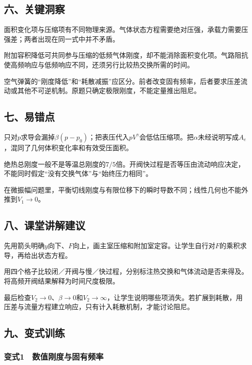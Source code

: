 \documentclass[12pt,a4paper,fontset=fandol]{ctexart}
\begin{document}
\subsection{六、关键洞察}\label{ux516dux5173ux952eux6d1eux5bdf}

面积变化项与压缩项有不同物理来源。气体状态方程需要绝对压强，承载力需要压强差；两者出现在同一式中并不矛盾。

附加容积降低可共同参与压缩的低频气体刚度，却不能消除面积变化项。气路阻抗使高频响应与低频响应不同，还须另行比较热交换所需的时间。

空气弹簧的``刚度降低''和``耗散减振''应区分。前者改变固有频率，后者要求压差流动或其他不可逆机制。原题只确定极限刚度，不能定量推出阻尼。

\subsection{七、易错点}\label{ux4e03ux6613ux9519ux70b9}

只对\(p\)求导会漏掉\(\beta(p-p_0)\)；把表压代入\(pV^\gamma\)会低估压缩项。把\(\alpha\)未经说明写成\(A_e\)，混同了几何体积变化率和有效受压面积。

绝热总刚度一般不是等温总刚度的\(7/5\)倍。开阀快过程是否等压由流动响应决定，不能同时假定``没有交换气体''与``始终压力相同''。

在微振幅问题里，平衡切线刚度与有限位移下的瞬时导数不同；线性几何也不能外推到\(V_1\to0\)。

\subsection{八、课堂讲解建议}\label{ux516bux8bfeux5802ux8bb2ux89e3ux5efaux8bae}

先用箭头明确\(y\)向下、\(F\)向上，画主室压缩和附加室定容。让学生自行对\(F\)的乘积求导，再给出状态方程。

用四个格子比较闭／开阀与慢／快过程，分别标注热交换和气体流动是否来得及。将高频开阀结果解释为时间尺度极限。

最后检查\(V_2\to0\)、\(\beta\to0\)和\(V_2\to\infty\)，让学生说明哪些项消失。若扩展到耗散，用压差与流量方程建立响应，只有计入耗散机制，才能讨论阻尼。

\subsection{九、变式训练}\label{ux4e5dux53d8ux5f0fux8badux7ec3}

\subsubsection{变式1　数值刚度与固有频率}\label{ux53d8ux5f0f1-ux6570ux503cux521aux5ea6ux4e0eux56faux6709ux9891ux7387}
\end{document}
